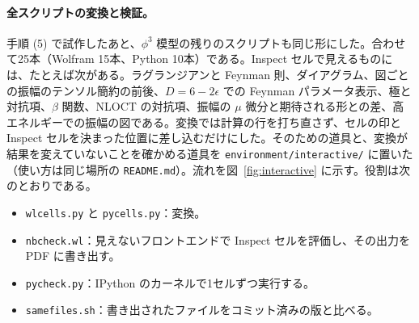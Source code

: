\documentclass[a4paper,10pt]{ltjsarticle}
\begin{document}
\paragraph{全スクリプトの変換と検証。}手順 (5) で試作したあと、$\phi^3$ 模型の残りのスクリプトも同じ形にした。合わせて25本（Wolfram 15本、Python 10本）である。Inspect セルで見えるものには、たとえば次がある。ラグランジアンと Feynman 則、ダイアグラム、図ごとの振幅のテンソル簡約の前後、$D=6-2\epsilon$ での Feynman パラメータ表示、極と対抗項、$\beta$ 関数、NLOCT の対抗項、振幅の $\mu$ 微分と期待される形との差、高エネルギーでの振幅の図である。変換では計算の行を打ち直さず、セルの印と Inspect セルを決まった位置に差し込むだけにした。そのための道具と、変換が結果を変えていないことを確かめる道具を \nolinkurl{environment/interactive/} に置いた（使い方は同じ場所の \nolinkurl{README.md}）。流れを図~\ref{fig:interactive} に示す。役割は次のとおりである。
\begin{itemize}
\item \texttt{wlcells.py} と \texttt{pycells.py}：変換。
\item \texttt{nbcheck.wl}：見えないフロントエンドで Inspect セルを評価し、その出力を PDF に書き出す。
\item \texttt{pycheck.py}：IPython のカーネルで1セルずつ実行する。
\item \texttt{samefiles.sh}：書き出されたファイルをコミット済みの版と比べる。
\end{itemize}
\end{document}
